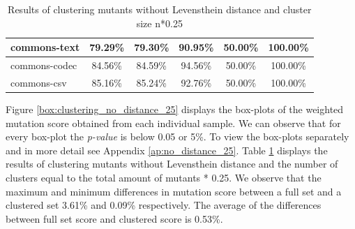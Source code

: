 \documentclass[../../main]{subfiles}
\begin{document}
\begin{table}[htb]
\begin{tabular}{|l|c|c|c|c|c|}
commons-text                  & 79.29\%                                                                                 & 79.30\%                                                                                     & 90.95\%                                                                              & 50.00\%                                                                               & 100.00\%                                                                             \\ \hline
commons-codec                 & 84.56\%                                                                                 & 84.59\%                                                                                     & 94.56\%                                                                              & 50.00\%                                                                               & 100.00\%                                                                             \\ \hline
commons-csv                   & 85.16\%                                                                                 & 85.24\%                                                                                     & 92.76\%                                                                              & 50.00\%                                                                               & 100.00\%                                                                             \\ \hline
\end{tabular}
\caption{\label{tab:clustering_no_distance_25}Results of clustering mutants without Levensthein distance and cluster size n*0.25}
\end{table}
\FloatBarrier

Figure \ref{box:clustering_no_distance_25} displays the box-plots of the weighted mutation score obtained from each individual sample.
We can observe that for every box-plot the \textit{p-value} is below 0.05 or 5\%.
To view the box-plots separately and in more detail see Appendix \ref{ap:no_distance_25}.
Table \ref{tab:clustering_no_distance_25} displays the results of clustering mutants without Levensthein distance and the number of clusters equal to the total amount of mutants * 0.25. 
We observe that the maximum and minimum differences in mutation score between a full set and a clustered set  3.61\% and 0.09\% respectively.
The average of the differences between full set score and clustered score is 0.53\%.
\end{document}
